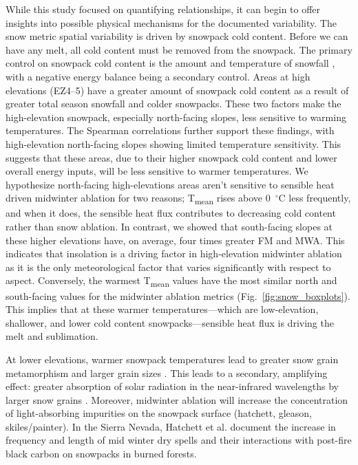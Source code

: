 While this study focused on quantifying relationships, it can begin to offer insights into possible physical mechanisms for the documented variability.
The snow metric spatial variability is driven by snowpack cold content. Before we can have any melt, all cold content must be removed from the snowpack. The primary control on snowpack cold content is the amount and temperature of snowfall \citep{jenningsObservationsSimulationsSeasonal2018}, with a negative energy balance being a secondary control. Areas at high elevations (EZ4--5) have a greater amount of snowpack cold content as a result of greater total season snowfall and colder snowpacks. These two factors make the high-elevation snowpack, especially north-facing slopes, less sensitive to warming temperatures. The Spearman correlations further support these findings, with high-elevation north-facing slopes showing limited temperature sensitivity. This suggests that these areas, due to their higher snowpack cold content and lower overall energy inputs, will be less sensitive to warmer temperatures. We hypothesize north-facing high-elevations areas aren't sensitive to sensible heat driven midwinter ablation for two reasons; T\textsubscript{mean} rises above 0~$^{\circ}$C less frequently, and when it does, the sensible heat flux contributes to decreasing cold content rather than snow ablation. In contrast, we showed that south-facing slopes at these higher elevations have, on average, four times greater FM and MWA. This indicates that insolation is a driving factor in high-elevation midwinter ablation as it is the only meteorological factor that varies significantly with respect to aspect. Conversely, the warmest T\textsubscript{mean} values have the most similar north and south-facing values for the midwinter ablation metrics (Fig.~\ref{fig:snow_boxplots}). This implies that at these warmer temperatures---which are low-elevation, shallower, and lower cold content snowpacks---sensible heat flux is driving the melt and sublimation. 





At lower elevations, warmer snowpack temperatures lead to greater snow grain metamorphism and larger grain sizes \citep{colbeckOverviewSeasonalSnow1982}. This leads to a secondary, amplifying effect: greater absorption of solar radiation in the near-infrared wavelengths by larger snow grains \citep{wiscombeModelSpectralAlbedo1980, warrenModelSpectralAlbedo1980}. Moreover, midwinter ablation will increase the concentration of light-absorbing impurities on the snowpack surface (hatchett, gleason, skiles/painter). In the Sierra Nevada, Hatchett et al. document the increase in frequency and length of mid winter dry spells and their interactions with post-fire black carbon on snowpacks in burned forests. 


